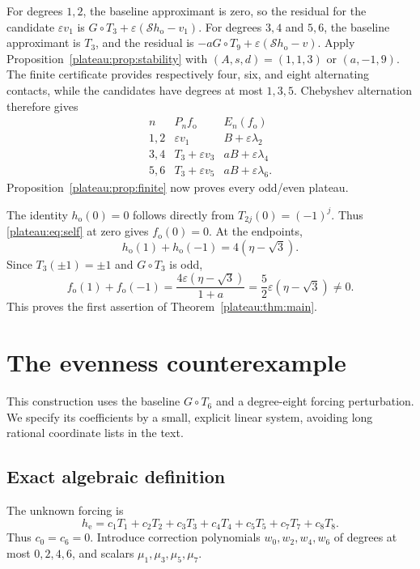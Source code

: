 \documentclass[11pt]{article}
\theoremstyle{remark}\newtheorem{remark}[theorem]{Remark}
\newcommand{\eps}{\varepsilon}
\begin{document}
For degrees $1,2$, the baseline approximant is zero, so the residual for
the candidate $\eps v_1$ is
$G\circ T_3+\eps(\mathcal S h_{\mathrm{o}}-v_1)$.
For degrees $3,4$ and $5,6$, the baseline approximant is $T_3$, and the
residual is $-aG\circ T_9+\eps(\mathcal S h_{\mathrm{o}}-v)$.
Apply Proposition~\ref{plateau:prop:stability} with
$(A,s,d)=(1,1,3)$ or $(a,-1,9)$.
The finite certificate provides respectively four, six, and eight
alternating contacts, while the candidates have degrees at most $1,3,5$.
Chebyshev alternation therefore gives
\[
\begin{array}{c|c|c}
 n&P_n f_{\mathrm{o}}&E_n(f_{\mathrm{o}})\\\hline
 1,2&\eps v_1&B+\eps\lambda_2\\
 3,4&T_3+\eps v_3&aB+\eps\lambda_4\\
 5,6&T_3+\eps v_5&aB+\eps\lambda_6.
\end{array}
\]
Proposition~\ref{plateau:prop:finite} now proves every odd/even plateau.

The identity $h_{\mathrm{o}}(0)=0$ follows directly from
$T_{2j}(0)=(-1)^j$. Thus \eqref{plateau:eq:self} at zero gives
$f_{\mathrm{o}}(0)=0$. At the endpoints,
\[
 h_{\mathrm{o}}(1)+h_{\mathrm{o}}(-1)=4(\eta-\sqrt3).
\]
Since $T_3(\pm1)=\pm1$ and $G\circ T_3$ is odd,
\begin{equation}\label{plateau:eq:oddwitness}
 f_{\mathrm{o}}(1)+f_{\mathrm{o}}(-1)
 =\frac{4\eps(\eta-\sqrt3)}{1+a}
 =\frac52\eps(\eta-\sqrt3)\ne0.
\end{equation}
This proves the first assertion of Theorem~\ref{plateau:thm:main}.

\section{The evenness counterexample}

This construction uses the baseline $G\circ T_6$ and a degree-eight
forcing perturbation. We specify its coefficients by a small, explicit
linear system, avoiding long rational coordinate lists in the text.

\subsection{Exact algebraic definition}

The unknown forcing is
\[
 h_{\mathrm{e}}=c_1T_1+c_2T_2+c_3T_3+c_4T_4+c_5T_5+c_7T_7+c_8T_8.
\]
Thus $c_0=c_6=0$. Introduce correction polynomials
$w_0,w_2,w_4,w_6$ of degrees at most $0,2,4,6$, and scalars
$\mu_1,\mu_3,\mu_5,\mu_7$.
\end{document}
